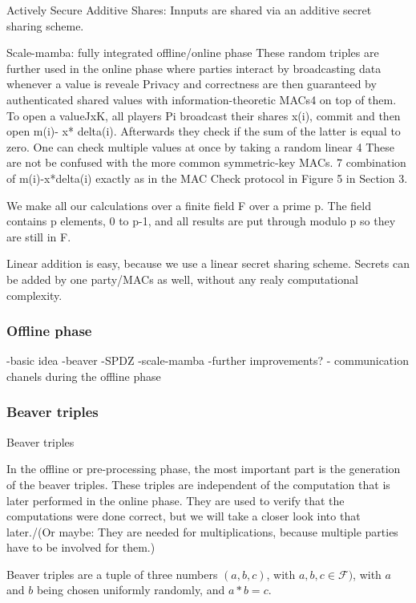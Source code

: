 \documentclass[english,runningheads,a4paper]{llncs}[2018/03/10]
\begin{document}
Actively Secure
Additive Shares: Innputs are shared via an additive secret sharing scheme.

Scale-mamba: fully integrated offline/online phase
These random triples are further used in the online phase where parties interact by broadcasting data whenever a value is reveale
Privacy and correctness are then guaranteed by authenticated shared values with information-theoretic MACs4 on top of them.
To open a valueJxK, all players Pi broadcast their shares x(i), commit and then open m(i)- x* delta(i). Afterwards they check if the sum of the latter is equal to zero. One can check multiple values at once by taking a random linear 4 These are not be confused with the more common symmetric-key MACs.
7
combination of m(i)-x*delta(i) exactly as in the MAC Check protocol in Figure 5 in Section 3. 


We make all our calculations over a finite field F over a prime p. The field contains p elements, 0 to p-1, and all results are put through modulo p so they are still in F.

Linear addition is easy, because we use a linear secret sharing scheme. Secrets can be added by one party/MACs as well, without any realy computational complexity. 


\subsubsection{Offline phase}

-basic idea
-beaver
-SPDZ
-scale-mamba
-further improvements?
- communication chanels during the offline phase


\subsubsection{Beaver triples}

Beaver triples 




In the offline or pre-processing phase, the most important part is the generation of the beaver triples. These triples  are independent of the computation that is later performed in the online phase. They are used to verify that the computations were done correct, but we will take a closer look into that later./(Or maybe: They are needed for multiplications, because multiple parties have to be involved for them.)

Beaver triples are a tuple of three numbers \((a,b,c)\), with \( a,b,c\in \mathcal{F} )\), with \(a\) and \(b\) being chosen uniformly randomly, and \(a*b=c\).
\end{document}
